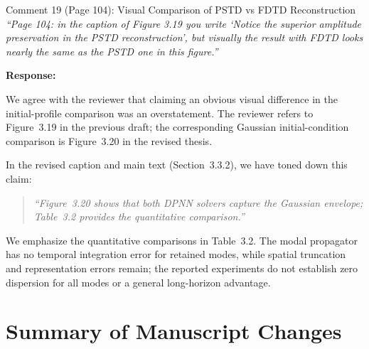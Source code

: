 \documentclass[11pt,a4paper]{article}
\newenvironment{response}{
    \par\vspace{1mm}\noindent\textbf{\textcolor{responseframe}{Response:}}\par\vspace{1mm}
}{
    \par\vspace{3mm}
}
\begin{document}
\vspace{2mm}
\begin{revcomment}{Comment 19 (Page 104): Visual Comparison of PSTD vs FDTD Reconstruction}
\emph{``Page 104: in the caption of Figure 3.19 you write `Notice the superior amplitude preservation in the PSTD reconstruction', but visually the result with FDTD looks nearly the same as the PSTD one in this figure.''}
\end{revcomment}

\begin{response}
We agree with the reviewer that claiming an obvious visual difference in the initial-profile comparison was an overstatement. The reviewer refers to Figure~3.19 in the previous draft; the corresponding Gaussian initial-condition comparison is Figure~3.20 in the revised thesis.

In the revised caption and main text (Section~3.3.2), we have toned down this claim:
\begin{quote}
    \emph{``Figure~3.20 shows that both DPNN solvers capture the Gaussian envelope; Table~3.2 provides the quantitative comparison.''}
\end{quote}
We emphasize the quantitative comparisons in Table~3.2. The modal propagator has no temporal integration error for retained modes, while spatial truncation and representation errors remain; the reported experiments do not establish zero dispersion for all modes or a general long-horizon advantage.
\end{response}

\newpage
\section{Summary of Manuscript Changes}
\end{document}
